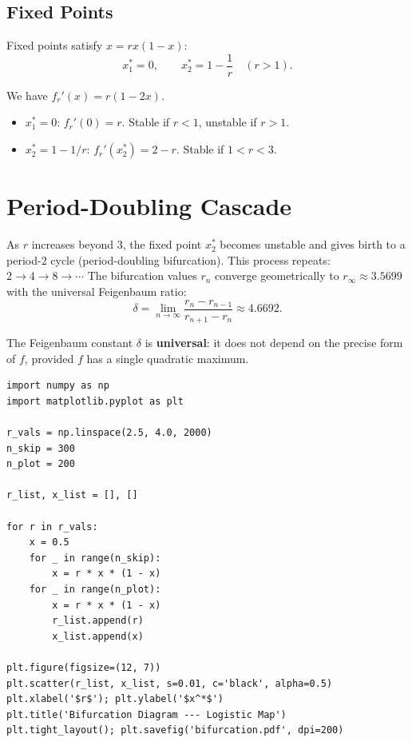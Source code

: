\subsection{Fixed Points}

Fixed points satisfy $x=rx(1-x)$:
\[
  x^*_1 = 0, \qquad x^*_2 = 1 - \frac{1}{r} \quad (r>1).
\]

\begin{proposition}
We have $f_r'(x) = r(1-2x)$.
\begin{itemize}
  \item $x^*_1=0$: $f_r'(0)=r$.  Stable if $r<1$, unstable if $r>1$.
  \item $x^*_2=1-1/r$: $f_r'(x^*_2)=2-r$.  Stable if $1<r<3$.
\end{itemize}
\end{proposition}

\section{Period-Doubling Cascade}
\label{sec:doubling}

\begin{theorem}
As $r$ increases beyond $3$, the fixed point $x^*_2$ becomes unstable
and gives birth to a period-$2$ cycle (period-doubling bifurcation).
This process repeats: $2\to 4\to 8\to\cdots$  The bifurcation values
$r_n$ converge geometrically to $r_\infty\approx 3.5699$ with the
universal Feigenbaum ratio:
\[
  \delta = \lim_{n\to\infty}\frac{r_n - r_{n-1}}{r_{n+1}-r_n}
  \approx 4.6692.
\]
\end{theorem}

\begin{remark}
The Feigenbaum constant $\delta$ is \textbf{universal}: it does not
depend on the precise form of $f$, provided $f$ has a single
quadratic maximum.
\end{remark}

\begin{codeblock}[title=\textbf{Bifurcation diagram of the logistic map}]
\begin{verbatim}
import numpy as np
import matplotlib.pyplot as plt

r_vals = np.linspace(2.5, 4.0, 2000)
n_skip = 300
n_plot = 200

r_list, x_list = [], []

for r in r_vals:
    x = 0.5
    for _ in range(n_skip):
        x = r * x * (1 - x)
    for _ in range(n_plot):
        x = r * x * (1 - x)
        r_list.append(r)
        x_list.append(x)

plt.figure(figsize=(12, 7))
plt.scatter(r_list, x_list, s=0.01, c='black', alpha=0.5)
plt.xlabel('$r$'); plt.ylabel('$x^*$')
plt.title('Bifurcation Diagram --- Logistic Map')
plt.tight_layout(); plt.savefig('bifurcation.pdf', dpi=200)
\end{verbatim}
\end{codeblock}

